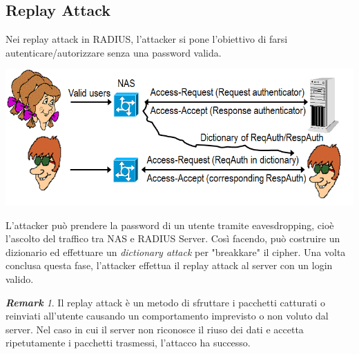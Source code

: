 \documentclass{book}
\theoremstyle{remark}
\newtheorem*{remark}{\textbf{Remark}}
\begin{document}
\subsection{Replay Attack}
Nei replay attack in RADIUS, l'attacker si pone l'obiettivo di farsi autenticare/autorizzare senza una password valida\@.
\begin{center}
	\includegraphics[scale=0.4]{replayRADIUS.png}
\end{center}
L'attacker può prendere la password di un utente tramite eavesdropping, cioè l'ascolto del traffico tra NAS e RADIUS Server\@. Così facendo, può costruire un dizionario ed effettuare un \emph{dictionary attack} per "breakkare" il cipher\@. Una volta conclusa questa fase, l'attacker effettua il replay attack al server con un login valido\@.
\begin{remark}
	Il replay attack è un metodo di sfruttare i pacchetti catturati o reinviati all'utente causando un comportamento imprevisto o non voluto dal server\@. Nel caso in cui il server non riconosce il riuso dei dati e accetta ripetutamente i pacchetti trasmessi, l'attacco ha successo\@.
\end{remark}
\end{document}
